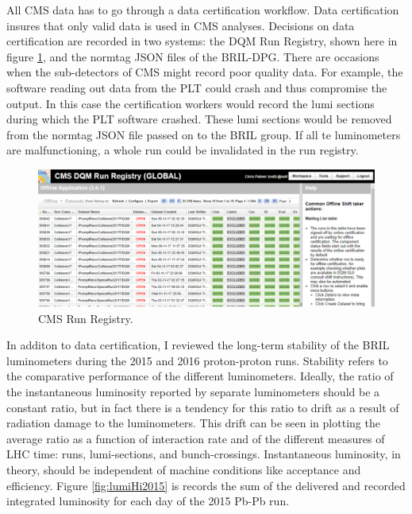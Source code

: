 All CMS data has to go through a data certification workflow. Data certification insures that only valid data is used in CMS analyses. Decisions on data certification are recorded in two systems: the DQM Run Registry, shown here in figure \ref{fig:runRegistry}, and the normtag JSON files of the BRIL-DPG. There are occasions when the sub-detectors of CMS might record poor quality data. For example, the software reading out data from the PLT could crash and thus compromise the output. In this case the certification workers would record the lumi sections during which the PLT software crashed. These lumi sections would be removed from the normtag JSON file passed on to the BRIL group. If all te luminometers are malfunctioning, a whole run could be invalidated in the run registry.

\begin{figure}[h!]
\begin{centering}
\includegraphics[width=6in]{Chapter4/importfigs/chris_palmer_run_registry.png}
\par\end{centering}
\caption{CMS Run Registry. \label{fig:runRegistry}}
\end{figure}

In additon to data certification, I reviewed the long-term stability of the BRIL luminometers during the 2015 and 2016 proton-proton runs. Stability refers to the comparative performance of the different luminometers. Ideally, the ratio of the instantaneous luminosity reported by separate luminometers should be a constant ratio, but in fact there is a tendency for this ratio to drift as a result of radiation damage to the luminometers. This drift can be seen in plotting the average ratio as a function of interaction rate and of the different measures of LHC time: runs, lumi-sections, and bunch-crossings.  Instantaneous luminosity, in theory, should be independent of machine conditions like acceptance and efficiency. Figure \ref{fig:lumiHi2015} is records the sum of the delivered and recorded integrated luminosity for each day of the 2015 Pb-Pb run. 

